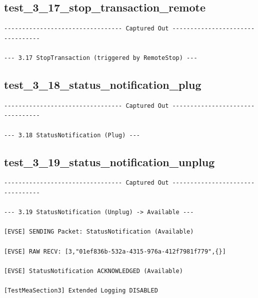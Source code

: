 \documentclass{article}
\begin{document}
\subsection*{test\_3\_17\_stop\_transaction\_remote}
\begin{lstlisting}
--------------------------------- Captured Out ---------------------------------

--- 3.17 StopTransaction (triggered by RemoteStop) ---
\end{lstlisting}
\subsection*{test\_3\_18\_status\_notification\_plug}
\begin{lstlisting}
--------------------------------- Captured Out ---------------------------------

--- 3.18 StatusNotification (Plug) ---
\end{lstlisting}
\subsection*{test\_3\_19\_status\_notification\_unplug}
\begin{lstlisting}
--------------------------------- Captured Out ---------------------------------

--- 3.19 StatusNotification (Unplug) -> Available ---

[EVSE] SENDING Packet: StatusNotification (Available)

[EVSE] RAW RECV: [3,"01ef836b-532a-4315-976a-412f7981f779",{}]

[EVSE] StatusNotification ACKNOWLEDGED (Available)

[TestMeaSection3] Extended Logging DISABLED
\end{lstlisting}
\end{document}

